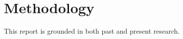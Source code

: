 \section{Methodology} \label{sec:methodology}

This report is grounded in both past and present research.
